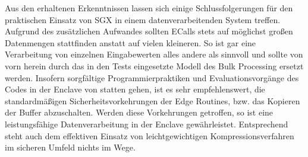 Aus den erhaltenen Erkenntnissen lassen sich einige Schlussfolgerungen für den praktischen Einsatz von \ac{SGX} in einem datenverarbeitenden System treffen. Aufgrund des zusätzlichen Aufwandes sollten \acp{ECall} stets auf möglichst großen Datenmengen stattfinden anstatt auf vielen kleineren. So ist gar eine Verarbeitung von einzelnen Eingabewerten alles andere als sinnvoll und sollte von vorn herein durch das in den Tests eingesetzte Modell des Bulk Processing ersetzt werden. Insofern sorgfältige Programmierpraktiken und Evaluationsvorgänge des Codes in der Enclave von statten gehen, ist es sehr empfehlenswert, die standardmäßigen Sicherheitsvorkehrungen der Edge Routines, bzw. das Kopieren der Buffer abzuschalten. Werden diese Vorkehrungen getroffen, so ist eine leistungsfähige Datenverarbeitung in der Enclave gewährleistet. Entsprechend steht auch dem effektiven Einsatz von leichtgewichtigen Kompressionsverfahren im sicheren Umfeld nichts im Wege.